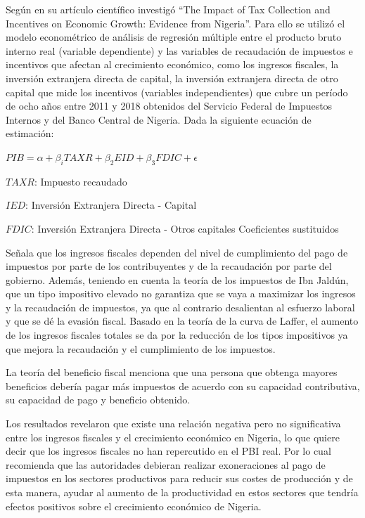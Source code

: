 \documentclass[
  letterpaper,
  DIV=11,
  numbers=noendperiod]{scrartcl}
\begin{document}
Según \textcite{akanbi_impact_2020} en su artículo científico investigó
``The Impact of Tax Collection and Incentives on Economic Growth:
Evidence from Nigeria''. Para ello se utilizó el modelo econométrico de
análisis de regresión múltiple entre el producto bruto interno real
(variable dependiente) y las variables de recaudación de impuestos e
incentivos que afectan al crecimiento económico, como los ingresos
fiscales, la inversión extranjera directa de capital, la inversión
extranjera directa de otro capital que mide los incentivos (variables
independientes) que cubre un período de ocho años entre 2011 y 2018
obtenidos del Servicio Federal de Impuestos Internos y del Banco Central
de Nigeria. Dada la siguiente ecuación de estimación:

\(PIB = \alpha + \beta_{i}TAXR + \beta_{2}EID + \beta_{3}FDIC + \epsilon\)

\(TAXR\): Impuesto recaudado

\(IED\): Inversión Extranjera Directa - Capital

\(FDIC\): Inversión Extranjera Directa - Otros capitales Coeficientes
sustituidos

Señala que los ingresos fiscales dependen del nivel de cumplimiento del
pago de impuestos por parte de los contribuyentes y de la recaudación
por parte del gobierno. Además, teniendo en cuenta la teoría de los
impuestos de Ibn Jaldún, que un tipo impositivo elevado no garantiza que
se vaya a maximizar los ingresos y la recaudación de impuestos, ya que
al contrario desalientan al esfuerzo laboral y que se dé la evasión
fiscal. Basado en la teoría de la curva de Laffer, el aumento de los
ingresos fiscales totales se da por la reducción de los tipos
impositivos ya que mejora la recaudación y el cumplimiento de los
impuestos.

La teoría del beneficio fiscal menciona que una persona que obtenga
mayores beneficios debería pagar más impuestos de acuerdo con su
capacidad contributiva, su capacidad de pago y beneficio obtenido.

Los resultados revelaron que existe una relación negativa pero no
significativa entre los ingresos fiscales y el crecimiento económico en
Nigeria, lo que quiere decir que los ingresos fiscales no han
repercutido en el PBI real. Por lo cual recomienda que las autoridades
debieran realizar exoneraciones al pago de impuestos en los sectores
productivos para reducir sus costes de producción y de esta manera,
ayudar al aumento de la productividad en estos sectores que tendría
efectos positivos sobre el crecimiento económico de Nigeria.
\end{document}
